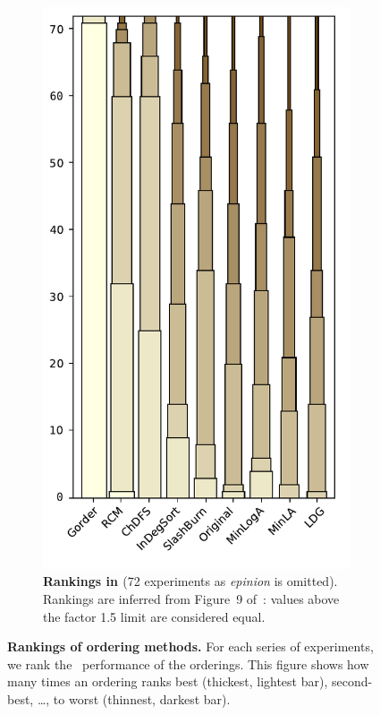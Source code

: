 \begin{figure}[htb]
\begin{subfigure}{.48\textwidth}
\includegraphics[width=\linewidth]{img/img-ranking-hao_vert.pdf}
\caption{\textbf{Rankings in \cite{gorder}} (72 experiments as \textit{epinion} is omitted). Rankings are inferred from Figure~9 of~\cite{gorder}: values above the factor 1.5 limit are considered equal.}\label{img-ranking-hao}
\end{subfigure}
\caption{\textbf{Rankings of ordering methods.} For each series of experiments, we rank the \runtime\ performance of the orderings. This figure shows how many times an ordering ranks best (thickest, lightest bar), second-best, \ldots, to worst (thinnest, darkest bar).}
\label{img-ranking}
\end{figure}





